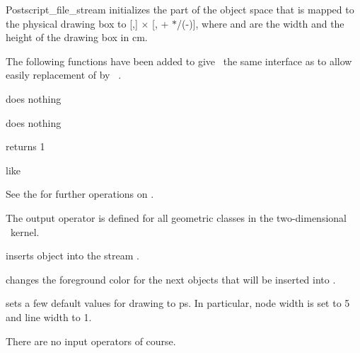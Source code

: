 \begin{ccRefClass} {Postscript_file_stream}
{initializes the  part of the object space that is mapped to the physical
drawing box to [,] $\times$ [, + 
$*$/(-)], where  and  
are the width and the height of the drawing box in cm.}

The following functions have been added to give \ccRefName\ the same interface
as  to allow easily replacement of  by
\ccRefName\ . 

{does nothing}

{does nothing}

{returns 1}

{like }

See the 
\cite{mnsu-lum} for further operations on .

\def\ccTagRmEigenClassName{\ccFalse}


The output operator is defined for all geometric classes in the two-dimensional
\cgal\ kernel.

       {inserts object  into the stream \ccVar.}

       {changes the foreground color for the next objects that
        will be inserted into \ccVar.}

{sets a few default values for drawing to ps. In particular, node width is
set to 5 and line width to 1.}

There are no input operators of course.

\end{ccRefClass} 
